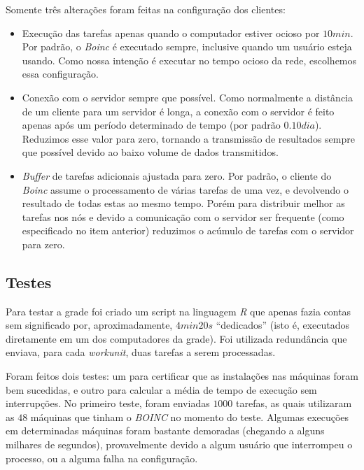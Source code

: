 Somente três alterações foram feitas na configuração dos clientes: 


\begin{itemize}
   \item Execução das tarefas apenas quando o computador estiver ocioso por $10min$. Por padrão, o \textit{Boinc} é 
executado sempre, inclusive quando um usuário esteja usando. Como nossa intenção é executar no tempo ocioso da rede, 
escolhemos essa configuração. 
   \item Conexão com o servidor sempre que possível. Como normalmente a distância de um cliente para um servidor é longa,
a conexão com o servidor é feito apenas após um período determinado de tempo (por padrão $0.10 dia$). Reduzimos 
esse valor para zero, tornando a transmissão de resultados sempre que possível devido ao baixo volume de dados transmitidos. 
   \item \emph{Buffer} de tarefas adicionais ajustada para zero. Por padrão, o cliente do \textit{Boinc} assume o processamento de várias
tarefas de uma vez, e devolvendo o resultado de todas estas ao mesmo tempo. Porém para distribuir melhor as
tarefas nos nós e devido a comunicação com o servidor ser frequente (como especificado no item anterior)
reduzimos o acúmulo de tarefas com o servidor para zero.
\end{itemize} 


\subsection{Testes}



Para testar a grade foi criado um script na linguagem \emph{R} que apenas fazia contas sem significado 
por, aproximadamente, $4min20s$ ``dedicados'' (isto é, executados diretamente em um dos computadores da grade). Foi utilizada  
redundância que enviava, 
para cada \textit{workunit}, duas tarefas a serem processadas.

Foram feitos dois testes: um para certificar que as instalações nas máquinas foram bem sucedidas, e outro para calcular a média de tempo de execução sem interrupções. No primeiro teste, foram enviadas $1000$ tarefas, as quais utilizaram as $48$ máquinas que tinham o \textit{BOINC} no momento do teste. Algumas execuções em determinadas máquinas foram bastante demoradas (chegando a alguns milhares de segundos), provavelmente devido a algum usuário que interrompeu o processo, ou a alguma falha na configuração. 

